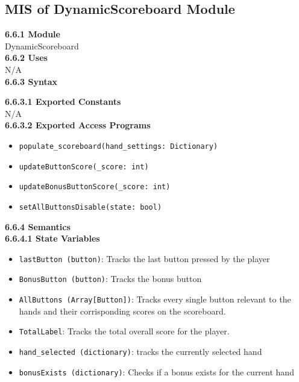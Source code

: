 \documentclass[12pt, titlepage]{article}
\begin{document}
\subsection{MIS of DynamicScoreboard Module}\label{DynamicScoreboard}
\textbf{6.6.1 Module}\\
 DynamicScoreboard\\

\noindent \textbf{6.6.2 Uses}\\

N/A \\

\noindent \textbf{6.6.3 Syntax}

\noindent \textbf{6.6.3.1 Exported Constants}\\

\noindent N/A\\

\textbf{6.6.3.2 Exported Access Programs}
\begin{itemize}
	\item \texttt{populate\_scoreboard(hand\_settings: Dictionary)}
	\item \texttt{updateButtonScore(\_score: int)}
	\item \texttt{updateBonusButtonScore(\_score: int)}
	\item \texttt{setAllButtonsDisable(state: bool)}
	
	
\end{itemize}

\noindent \textbf{6.6.4 Semantics}\\
\textbf{6.6.4.1 State Variables}\\
\begin{itemize}
	\item \texttt{lastButton (button)}: Tracks the last button pressed by the player
	\item \texttt{BonusButton (button)}: Tracks the bonus button 
	\item \texttt{AllButtons (Array[Button])}: Tracks every single button relevant to the hands and their corrisponding scores on the scoreboard.
	\item \texttt{TotalLabel}: Tracks the total overall score for the player.
	\item \texttt{hand\_selected (dictionary)}: tracks the currently selected hand
	\item \texttt{bonusExists (dictionary)}: Checks if a bonus exists for the current hand

\end{itemize}
\end{document}
